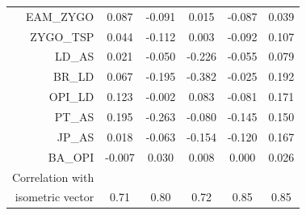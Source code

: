 \begin{refsection}
\begin{table}
\begin{tabular}{rccccc}
  EAM\_ZYGO & 0.087 & -0.091 & 0.015 & -0.087 & 0.039 \\
  ZYGO\_TSP & 0.044 & -0.112 & 0.003 & -0.092 & 0.107 \\
  LD\_AS & 0.021 & -0.050 & -0.226 & -0.055 & 0.079 \\
  BR\_LD & 0.067 & -0.195 & -0.382 & -0.025 & 0.192 \\
  OPI\_LD & 0.123 & -0.002 & 0.083 & -0.081 & 0.171 \\
  PT\_AS & 0.195 & -0.263 & -0.080 & -0.145 & 0.150 \\
  JP\_AS & 0.018 & -0.063 & -0.154 & -0.120 & 0.167 \\
  BA\_OPI & -0.007 & 0.030 & 0.008 & 0.000 & 0.026 \\
        \hline
        Correlation with \\ isometric vector & 0.71 & 0.80 &  0.72 &  0.85 & 0.85 \\
    \end{tabular}
    \label{sup:isocomp}
\end{table}


\end{refsection}
